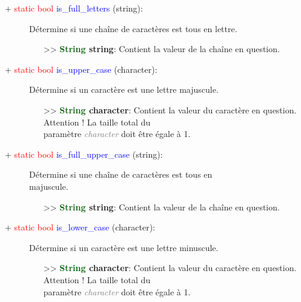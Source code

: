 \documentclass[a4paper, 11pt]{article}
\begin{document}
	\begin{description}
		\item [+ \textcolor{red}{static bool} \textcolor{blue}{is\_full\_letters} (string):] Détermine si 
		une chaîne de caractères est tous en lettre.
		\begin{itemize}
			\item [>> \textbf{\textcolor{darkgreen}{String} string}:] Contient la valeur de la chaîne en 
			question.\\
		\end{itemize}
	\end{description}
	\begin{description}
		\item [+ \textcolor{red}{static bool} \textcolor{blue}{is\_upper\_case} (character):] Détermine si 
		un caractère est une lettre majuscule.
		\begin{itemize}
			\item [>> \textbf{\textcolor{darkgreen}{String} character}:] Contient la valeur du caractère en 
			question. Attention ! La taille total du \\paramètre \textit{\textcolor{gray}{character}} doit 
			être égale à 1.\\
		\end{itemize}
	\end{description}
	\begin{description}
		\item [+ \textcolor{red}{static bool} \textcolor{blue}{is\_full\_upper\_case} (string):] Détermine 
		si une chaîne de caractères est tous en \\majuscule.
		\begin{itemize}
			\item [>> \textbf{\textcolor{darkgreen}{String} string}:] Contient la valeur de la chaîne en 
			question.\\
		\end{itemize}
	\end{description}
	\begin{description}
		\item [+ \textcolor{red}{static bool} \textcolor{blue}{is\_lower\_case} (character):] Détermine si 
		un caractère est une lettre minuscule.
		\begin{itemize}
			\item [>> \textbf{\textcolor{darkgreen}{String} character}:] Contient la valeur du caractère en 
			question. Attention ! La taille total du \\paramètre \textit{\textcolor{gray}{character}} doit 
			être égale à 1.\\
		\end{itemize}
	\end{description}
\end{document}

